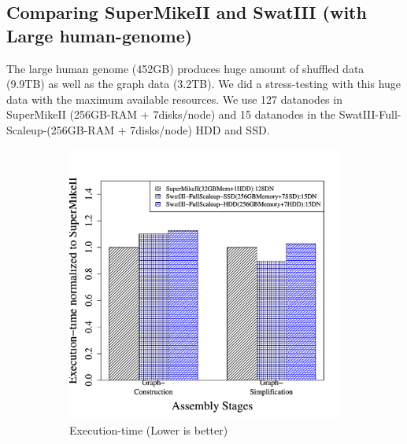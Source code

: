\documentclass[conference]{IEEEtran}
\begin{document}
\subsection {Comparing SuperMikeII and SwatIII (with Large human-genome)} \label{SecPerfDiffArchHum}
The large human genome (452GB)  produces huge amount of shuffled data (9.9TB) as well as the graph data (3.2TB). 
We did a stress-testing with this huge data with the maximum available resources. 
We use 127 datanodes in SuperMikeII (256GB-RAM + 7disks/node) and 15 datanodes in the SwatIII-Full-Scaleup-(256GB-RAM + 7disks/node) HDD and SSD.
\begin{figure}[htb]
        \begin{subfigure}[b]{0.23\textwidth}
                \includegraphics[width=\textwidth]{Figure/PerormanceData/Plots/PerfDiffArchHum.pdf}
                \caption{Execution-time (Lower is better)}
                \label{fig:DifferentArchitecturesPerfHum}
        \end{subfigure}
        \begin{subfigure}[b]{0.23\textwidth}

\end{subfigure}
\end{figure}
\end{document}
